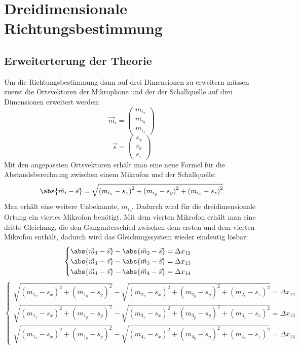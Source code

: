 \section{Dreidimensionale Richtungsbestimmung} 
\subsection{Erweiterterung der Theorie}
Um die Richtungsbestimmung dann auf drei Dimensionen zu erweitern müssen zuerst die Ortsvektoren der Mikrophone und der der Schallquelle auf drei Dimensionen erweitert werden: $$\vec{m}_i = \begin{pmatrix}
m_{i_x} \\
m_{i_y} \\
m_{i_z}
\end{pmatrix}$$
$$\vec{s} = \begin{pmatrix}
{s_x} \\
{s_y} \\
{s_z}
\end{pmatrix}$$
Mit den angepassten Ortsvektoren erhält man eine neue Formel für die Abstandsberechnung zwischen einem Mikrofon und der Schallquelle:
$$\abs{\vec{m}_i - \vec{s}} = \sqrt{{(m_{i_x} - s_x)}^2 + {(m_{i_y} - s_y)}^2 + {(m_{i_z} - s_z)}^2}$$
Man erhält eine weitere Unbekannte, $m_{i_z}$. Dadurch wird für die dreidimensionale Ortung ein viertes Mikrofon benötigt. Mit dem vierten Mikrofon erhält man eine dritte Gleichung, die den Gangunterschied zwischen dem ersten und dem vierten Mikrofon enthält, dadurch wird das Gleichungssystem wieder eindeutig lösbar:
$$\begin{cases}
\abs{\vec{m}_1 - \vec{s}} - \abs{\vec{m}_2 - \vec{s}} = \Delta{x_{12}} \\
\abs{\vec{m}_1 - \vec{s}} - \abs{\vec{m}_3 - \vec{s}} = \Delta{x_{13}} \\
\abs{\vec{m}_1 - \vec{s}} - \abs{\vec{m}_4 - \vec{s}} = \Delta{x_{14}}
\end{cases}$$
$$\begin{cases}
\sqrt{{(m_{1_x} - s_x)}^2 + {(m_{1_y} - s_y)}^2} - \sqrt{{(m_{2_x} - s_x)}^2 + {(m_{2_y} - s_y)}^2 + {(m_{2_z} - s_z)}^2} = \Delta{x_{12}} \\
\sqrt{{(m_{1_x} - s_x)}^2 + {(m_{1_y} - s_y)}^2} - \sqrt{{(m_{3_x} - s_x)}^2 + {(m_{3_y} - s_y)}^2 + {(m_{3_z} - s_z)}^2} = \Delta{x_{13}} \\
\sqrt{{(m_{1_x} - s_x)}^2 + {(m_{1_y} - s_y)}^2} - \sqrt{{(m_{4_x} - s_x)}^2 + {(m_{4_y} - s_y)}^2 + {(m_{4_z} - s_z)}^2} = \Delta{x_{14}}
\end{cases}$$
